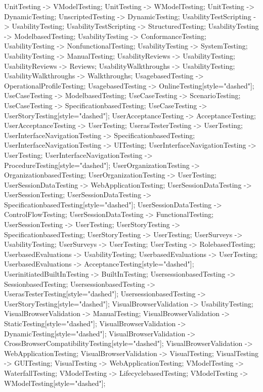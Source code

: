 \documentclass{article}
\begin{document}
{UnitTesting -> VModelTesting;
UnitTesting -> WModelTesting;
UnitTesting -> DynamicTesting;
UnscriptedTesting -> DynamicTesting;
UsabilityTestScripting -> UsabilityTesting;
UsabilityTestScripting -> StructuredTesting;
UsabilityTesting -> ModelbasedTesting;
UsabilityTesting -> ConformanceTesting;
UsabilityTesting -> NonfunctionalTesting;
UsabilityTesting -> SystemTesting;
UsabilityTesting -> ManualTesting;
UsabilityReviews -> UsabilityTesting;
UsabilityReviews -> Reviews;
UsabilityWalkthroughs -> UsabilityTesting;
UsabilityWalkthroughs -> Walkthroughs;
UsagebasedTesting -> OperationalProfileTesting;
UsagebasedTesting -> OnlineTesting[style="dashed"];
UseCaseTesting -> ModelbasedTesting;
UseCaseTesting -> ScenarioTesting;
UseCaseTesting -> SpecificationbasedTesting;
UseCaseTesting -> UserStoryTesting[style="dashed"];
UserAcceptanceTesting -> AcceptanceTesting;
UserAcceptanceTesting -> UserTesting;
UserasTesterTesting -> UserTesting;
UserInterfaceNavigationTesting -> SpecificationbasedTesting;
UserInterfaceNavigationTesting -> UITesting;
UserInterfaceNavigationTesting -> UserTesting;
UserInterfaceNavigationTesting -> ProcedureTesting[style="dashed"];
UserOrganizationTesting -> OrganizationbasedTesting;
UserOrganizationTesting -> UserTesting;
UserSessionDataTesting -> WebApplicationTesting;
UserSessionDataTesting -> UserSessionTesting;
UserSessionDataTesting -> SpecificationbasedTesting[style="dashed"];
UserSessionDataTesting -> ControlFlowTesting;
UserSessionDataTesting -> FunctionalTesting;
UserSessionTesting -> UserTesting;
UserStoryTesting -> SpecificationbasedTesting;
UserStoryTesting -> UserTesting;
UserSurveys -> UsabilityTesting;
UserSurveys -> UserTesting;
UserTesting -> RolebasedTesting;
UserbasedEvaluations -> UsabilityTesting;
UserbasedEvaluations -> UserTesting;
UserbasedEvaluations -> AcceptanceTesting[style="dashed"];
UserinitiatedBuiltInTesting -> BuiltInTesting;
UsersessionbasedTesting -> SessionbasedTesting;
UsersessionbasedTesting -> UserasTesterTesting[style="dashed"];
UsersessionbasedTesting -> UserStoryTesting[style="dashed"];
VisualBrowserValidation -> UsabilityTesting;
VisualBrowserValidation -> ManualTesting;
VisualBrowserValidation -> StaticTesting[style="dashed"];
VisualBrowserValidation -> DynamicTesting[style="dashed"];
VisualBrowserValidation -> CrossBrowserCompatibilityTesting[style="dashed"];
VisualBrowserValidation -> WebApplicationTesting;
VisualBrowserValidation -> VisualTesting;
VisualTesting -> GUITesting;
VisualTesting -> WebApplicationTesting;
VModelTesting -> WaterfallTesting;
VModelTesting -> LifecyclebasedTesting;
VModelTesting -> WModelTesting[style="dashed"];
}
\end{document}
